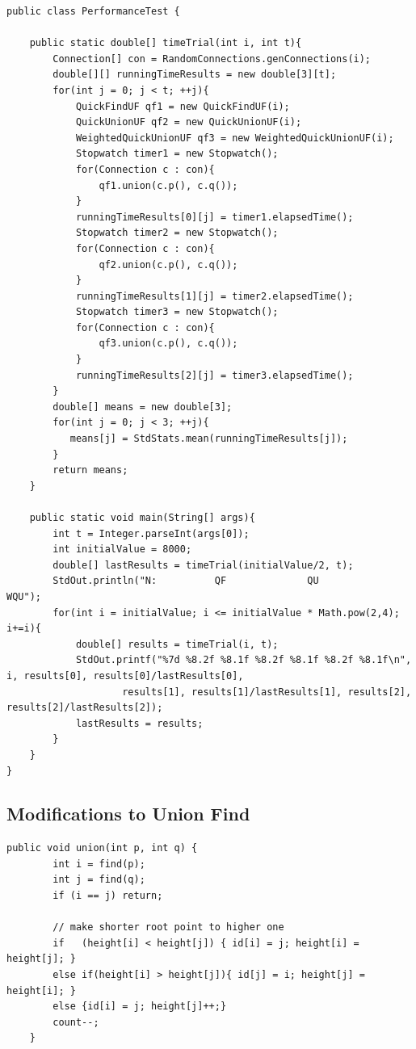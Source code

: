 \documentclass{article}
\begin{document}
\begin{lstlisting}[caption=Performance test client., label=code:perf]
public class PerformanceTest {

    public static double[] timeTrial(int i, int t){
        Connection[] con = RandomConnections.genConnections(i);
        double[][] runningTimeResults = new double[3][t];
        for(int j = 0; j < t; ++j){
            QuickFindUF qf1 = new QuickFindUF(i);
            QuickUnionUF qf2 = new QuickUnionUF(i);
            WeightedQuickUnionUF qf3 = new WeightedQuickUnionUF(i);
            Stopwatch timer1 = new Stopwatch();
            for(Connection c : con){
                qf1.union(c.p(), c.q());
            }
            runningTimeResults[0][j] = timer1.elapsedTime();
            Stopwatch timer2 = new Stopwatch();
            for(Connection c : con){
                qf2.union(c.p(), c.q());
            }
            runningTimeResults[1][j] = timer2.elapsedTime();
            Stopwatch timer3 = new Stopwatch();
            for(Connection c : con){
                qf3.union(c.p(), c.q());
            }
            runningTimeResults[2][j] = timer3.elapsedTime();
        }
        double[] means = new double[3];
        for(int j = 0; j < 3; ++j){
           means[j] = StdStats.mean(runningTimeResults[j]);
        }
        return means;
    }

    public static void main(String[] args){
        int t = Integer.parseInt(args[0]);
        int initialValue = 8000;
        double[] lastResults = timeTrial(initialValue/2, t);
        StdOut.println("N:          QF              QU              WQU");
        for(int i = initialValue; i <= initialValue * Math.pow(2,4); i+=i){
            double[] results = timeTrial(i, t);
            StdOut.printf("%7d %8.2f %8.1f %8.2f %8.1f %8.2f %8.1f\n", i, results[0], results[0]/lastResults[0],
                    results[1], results[1]/lastResults[1], results[2], results[2]/lastResults[2]);
            lastResults = results;
        }
    }
}
\end{lstlisting}
\pagebreak

\subsection{Modifications to Union Find}

\begin{lstlisting}[caption=union function in HQU, label=code:union]
    public void union(int p, int q) {
        int i = find(p);
        int j = find(q);
        if (i == j) return;

        // make shorter root point to higher one
        if   (height[i] < height[j]) { id[i] = j; height[i] =  height[j]; }
        else if(height[i] > height[j]){ id[j] = i; height[j] = height[i]; }
        else {id[i] = j; height[j]++;}
        count--;
    }
\end{lstlisting}
\vspace{3ex}
\end{document}
